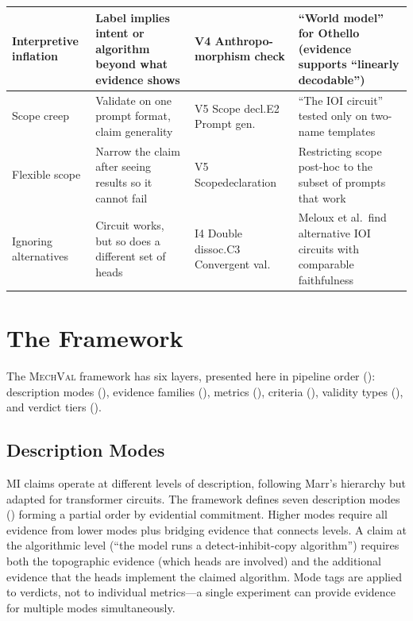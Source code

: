 \documentclass[10pt]{article}
\newcommand{\mechval}{\textsc{MechVal}}
\begin{document}
\begin{table}[H]
\begin{tabular}{@{}l>{\raggedright\arraybackslash}p{3.2cm}>{\raggedright\arraybackslash}p{2.8cm}>{\raggedright\arraybackslash}p{4.0cm}@{}}
\midrule
Interpretive inflation & Label implies intent or algorithm beyond what evidence shows & V4 Anthropo-\newline morphism check & ``World model'' for Othello (evidence supports ``linearly decodable'') \\
\midrule
Scope creep & Validate on one prompt format, claim generality & V5 Scope decl.\newline E2 Prompt gen. & ``The IOI circuit'' tested only on two-name templates \\
\midrule
Flexible scope & Narrow the claim after seeing results so it cannot fail & V5 Scope\newline declaration & Restricting scope post-hoc to the subset of prompts that work \\
\midrule
Ignoring alternatives & Circuit works, but so does a different set of heads & I4 Double dissoc.\newline C3 Convergent val. & Meloux et al.\ find alternative IOI circuits with comparable faithfulness \\
\bottomrule
\end{tabular}
\end{table}
\endgroup


\section{The Framework}
\label{sec:framework}

The \mechval{} framework has six layers, presented here in pipeline order (): description modes (), evidence families (), metrics (), criteria (), validity types (), and verdict tiers ().

\subsection{Description Modes}
\label{sec:description-modes}

MI claims operate at different levels of description, following Marr's hierarchy but adapted for transformer circuits. The framework defines seven description modes () forming a partial order by evidential commitment. Higher modes require all evidence from lower modes plus bridging evidence that connects levels. A claim at the algorithmic level (``the model runs a detect-inhibit-copy algorithm'') requires both the topographic evidence (which heads are involved) and the additional evidence that the heads implement the claimed algorithm. Mode tags are applied to verdicts, not to individual metrics---a single experiment can provide evidence for multiple modes simultaneously.
\end{document}
